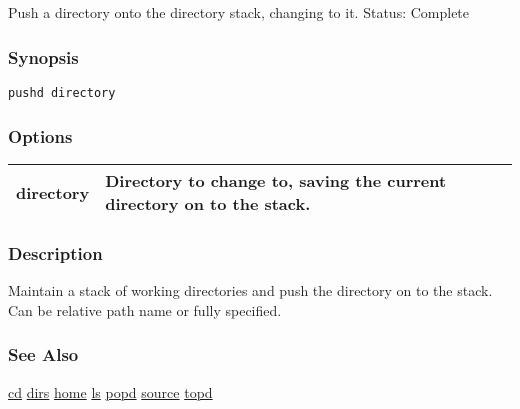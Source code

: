 \subsection{}
\label{pushd}
Push a directory onto the directory stack, changing to it. 
 Status: Complete
\subsubsection*{Synopsis}
\begin{verbatim}
pushd directory
\end{verbatim}
\subsubsection*{Options}
\begin{tabular}{|l|l|}
\hline 
 directory  & Directory to change to, saving the current directory on to the stack.  \\
 \hline 
\end{tabular}
\subsubsection*{Description}
 Maintain a stack of working directories and push the directory on to the stack. Can be relative path name or fully specified. 
\subsubsection*{See Also}
\hyperref[cd]{cd} \hyperref[dirs]{dirs} \hyperref[home]{home} \hyperref[ls]{ls} \hyperref[popd]{popd} \hyperref[source]{source} \hyperref[topd]{topd} 